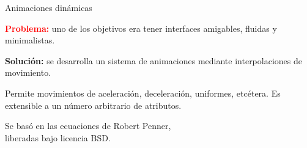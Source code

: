 \begin{frame}{Animaciones dinámicas}
  \begin{center}
    \textcolor{red}{\textbf{Problema:}} uno de los objetivos era tener
    interfaces amigables, fluidas y minimalistas.

    \pause \medskip

    \textcolor{dgreen}{\textbf{Solución:}} se desarrolla un sistema de
    animaciones mediante interpolaciones de movimiento.

    \pause\medskip

    Permite movimientos de aceleración, deceleración, uniformes, etcétera. Es
    extensible a un número arbitrario de atributos.

    \pause\medskip

    Se basó en las ecuaciones de Robert Penner, \\liberadas bajo licencia BSD.
    
  \end{center}  
\end{frame}

